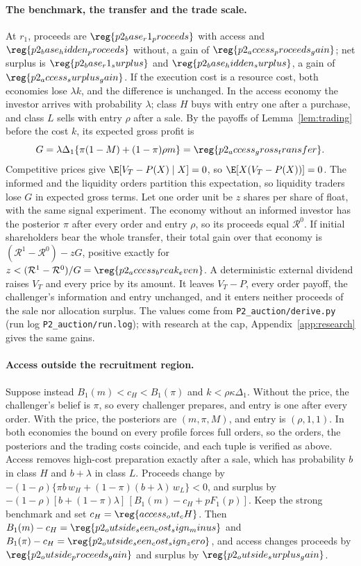 \paragraph{The benchmark, the transfer and the trade scale.}
At \(r_1\), proceeds are \(\reg{p2_base_r1_proceeds}\) with access and \(\reg{p2_base_hidden_proceeds}\) without, a gain of
\(\reg{p2_access_proceeds_gain}\); net surplus is \(\reg{p2_base_r1_surplus}\) and \(\reg{p2_base_hidden_surplus}\), a gain of
\(\reg{p2_access_surplus_gain}\). If the execution cost is a resource cost, both economies lose \(\lambda k\), and the
difference is unchanged. In the access economy the investor arrives with probability \(\lambda\); class \(H\) buys
with entry one after a purchase, and class \(L\) sells with entry \(\rho\) after a sale. By the payoffs of
Lemma~\ref{lem:trading} before the cost \(k\), its expected gross profit is
\[
G=\lambda\Delta_1\{\pi(1-M)+(1-\pi)\rho m\}=\reg{p2_access_gross_transfer}.
\]
Competitive prices give \(\E[V_T-P(X)\mid X]=0\), so \(\E[X(V_T-P(X))]=0\). The informed and the liquidity orders
partition this expectation, so liquidity traders lose \(G\) in expected gross terms. Let one order unit be \(z\)
shares per share of float, with the same signal experiment. The economy without an informed investor has the
posterior \(\pi\) after every order and entry \(\rho\), so its proceeds equal \(\mathcal R^0\). If initial shareholders
bear the whole transfer, their total gain over that economy is \((\mathcal R^1-\mathcal R^0)-zG\), positive exactly
for \(z<(\mathcal R^1-\mathcal R^0)/G=\reg{p2_access_break_even}\). A deterministic external dividend raises \(V_T\)
and every price by its amount. It leaves \(V_T-P\), every order payoff, the challenger's information and entry
unchanged, and it enters neither proceeds of the sale nor allocation surplus. The values come from
\nolinkurl{P2_auction/derive.py} (run log
\nolinkurl{P2_auction/run.log}); with research at the cap, Appendix~\ref{app:research}
gives the same gains.

\paragraph{Access outside the recruitment region.}
Suppose instead \(B_1(m)<c_H<B_1(\pi)\) and \(k<\rho\kappa\Delta_1\). Without the price, the challenger's belief is
\(\pi\), so every challenger prepares, and entry is one after every order. With the price, the posteriors are
\((m,\pi,M)\), and entry is \((\rho,1,1)\). In both economies the bound on every profile forces full orders, so the
orders, the posteriors and the trading costs coincide, and each tuple is verified as above. Access removes
high-cost preparation exactly after a sale, which has probability \(b\) in class \(H\) and \(b+\lambda\) in class
\(L\). Proceeds change by \(-(1-\rho)\{\pi b\,w_H+(1-\pi)(b+\lambda)\,w_L\}<0\), and surplus by
\(-(1-\rho)[b+(1-\pi)\lambda]\,[B_1(m)-c_H+pF_1(p)]\). Keep the strong benchmark and set
\(c_H=\reg{access_out_cH}\). Then \(B_1(m)-c_H=\reg{p2_outside_seen_cost_sign_minus}\) and
\(B_1(\pi)-c_H=\reg{p2_outside_seen_cost_sign_zero}\), and access changes proceeds by \(\reg{p2_outside_proceeds_gain}\)
and surplus by \(\reg{p2_outside_surplus_gain}\).

